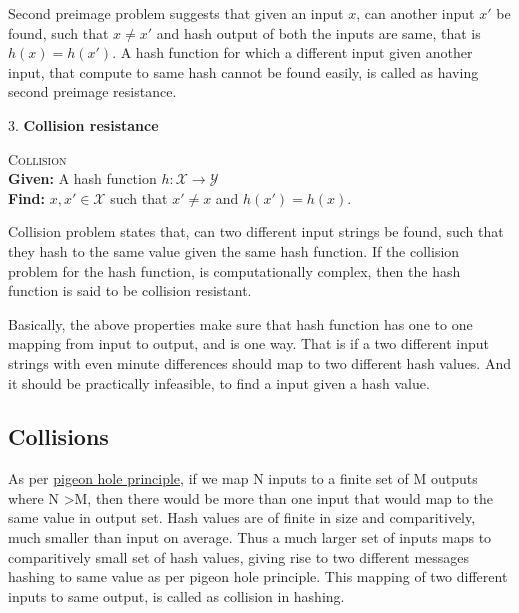 Second preimage problem suggests that given an input $x$, can another input $x'$ be found, such that
$ x \neq x'$ and hash output of both the inputs are same, that is $h(x) = h(x')$. A hash function for
which a different input given another input, that compute to same hash cannot be found easily, is 
called as having second preimage resistance.

3. {\bf Collision resistance}
\begin{center}
  \framebox
  {
    \parbox{300pt}
    {
      \centering \textsc{Collision} \\
      {\bf Given:} A hash function $h : \mathcal{X} \to \mathcal{Y}$ \\
      {\bf Find:} $x, x' \in \mathcal{X}$ such that $x' \neq x$ and $h(x') = h(x)$. 
    }
  }
\end{center}
\vspace{4mm}

Collision problem states that, can two different input strings be found, such that they hash to the
same value given the same hash function. If the collision problem for the hash function, is computationally
complex, then the hash function is said to be collision resistant.

Basically, the above properties make sure that hash function has one to one mapping from input to
output, and is one way. That is if a two different input strings with even minute differences should
map to two different hash values. And it should be practically infeasible, to find a input given a
hash value.

\subsection{Collisions}

As per \href{"http://en.wikipedia.org/wiki/Pigeonhole_principle"}{pigeon hole principle}, if we map N inputs 
to a finite set of M outputs where N \textgreater M, then there would be more than one input that would 
map to the same value in output set. Hash values are of finite in size and comparitively, much smaller than
input on average. Thus a much larger set of inputs maps to comparitively small set of hash values, giving
rise to two different messages hashing to same value as per pigeon hole principle. This mapping of two different
inputs to same output, is called as collision in hashing.

